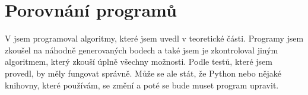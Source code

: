 \chapter{Porovnání programů}
\label{chap:diskuze}

V  jsem programoval algoritmy, které jsem uvedl v teoretické části. Programy jsem zkoušel na náhodně generovaných bodech a také jsem je zkontroloval jiným algoritmem, který zkouší úplně všechny možnosti. Podle testů, které jsem provedl, by měly fungovat správně. Může se ale stát, že Python nebo nějaké knihovny, které používám, se změní a poté se bude muset program upravit. 

